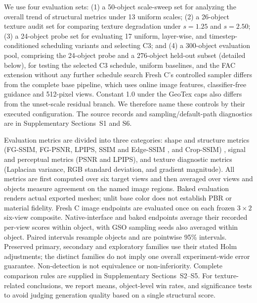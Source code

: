 \documentclass[times,twocolumn,final]{elsarticle}
\providecommand{\DIFadd}[1]{{\protect\color{blue} \sf #1}} %
\providecommand{\DIFdel}[1]{{\protect\color{red} \scriptsize #1}} %
\providecommand{\DIFaddbegin}{} %
\providecommand{\DIFaddend}{} %
\providecommand{\DIFdelbegin}{} %
\providecommand{\DIFdelend}{} %
\begin{document}
\DIFdelbegin %

\DIFdel{We use four evaluation sets: (1) a 50-object scale-sweep set for analyzing the overall trend of structural metrics under 13 uniform scales; (2) a 26-object texture audit set for comparing texture degradation under $s = 1.25$ and $s = 2.50$; (3) a 24-object probe set for evaluating 17 uniform, layer-wise, and timestep-conditioned scheduling variants and selecting C3; and (4) a 300-object evaluation pool, comprising the 24-object probe and a 276-object held-out subset (detailed below), for testing the selected C3 schedule, uniform baselines, and the FAC extension without any further schedule search}\DIFdelend \DIFaddbegin \DIFadd{Fresh C's controlled sampler differs from the complete base pipeline, which uses online image features, classifier-free guidance and 512-pixel views. Constant 1.0 under the GeoTex caps also differs from the unset-scale residual branch. We therefore name these controls by their executed configuration. The source records and sampling/default-path diagnostics are in Supplementary Sections~S1 and S6}\DIFaddend .

\DIFdelbegin \DIFdel{Evaluation metrics are divided into three categories: shape and structure metrics (FG-SSIM, }\DIFdelend \DIFaddbegin \DIFadd{FG-PSNR, LPIPS, SSIM and }\DIFaddend Edge-SSIM \DIFdelbegin \DIFdel{, and Crop-SSIM) , signal and perceptual metrics (PSNR and LPIPS), and texture diagnostic metrics (Laplacian variance, RGB standard deviation, and gradient magnitude). All metrics are first computed over six target views and then averaged over views and objects }\DIFdelend \DIFaddbegin \DIFadd{measure agreement on the named image regions. Baked evaluation renders actual exported meshes; unlit base color does not establish PBR or material fidelity. Fresh C image endpoints are evaluated once on each frozen $3\times2$ six-view composite. Native-interface and baked endpoints average their recorded per-view scores within object, with GSO sampling seeds also averaged within object. Paired intervals resample objects and are pointwise 95\% intervals. Preserved primary, secondary and exploratory families use their stated Holm adjustments; the distinct families do not imply one overall experiment-wide error guarantee. Non-detection is not equivalence or non-inferiority. Complete comparison rules are supplied in Supplementary Sections~S2--S5}\DIFaddend .
\DIFdelbegin \DIFdel{For texture-related conclusions, we report means, object-level win rates, and significance tests to avoid judging generation quality based on a single structural score.
}\DIFdelend 
\end{document}
